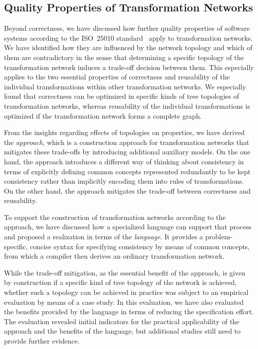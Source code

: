 \subsection{Quality Properties of Transformation Networks}

Beyond correctness, we have discussed how further quality properties of software systems according to the ISO~25010 standard~\cite{iso25010} apply to transformation networks.
We have identified how they are influenced by the network topology and which of them are contradictory in the sense that determining a specific topology of the transformation network induces a trade-off decision between them.
This especially applies to the two essential properties of correctness and reusability of the individual transformations within other transformation networks.
We especially found that correctness can be optimized in specific kinds of tree topologies of transformation networks, whereas reusability of the individual transformations is optimized if the transformation network forms a complete graph.

From the insights regarding effects of topologies on properties, we have derived the \emph{\commonalities approach}, which is a construction approach for transformation networks that mitigates these trade-offs by introducing additional auxiliary models.
On the one hand, the approach introduces a different way of thinking about consistency in terms of explicitly defining common concepts represented redundantly to be kept consistency rather than implicitly encoding them into rules of transformations.
On the other hand, the approach mitigates the trade-off between correctness and reusability.

To support the construction of transformation networks according to the \commonalities approach, we have discussed how a specialized language can support that process and proposed a realization in terms of the \emph{\commonalities language}.
It provides a problem-specific, concise syntax for specifying consistency by means of common concepts, from which a compiler then derives an ordinary transformation network.

While the trade-off mitigation, as the essential benefit of the approach, is given by construction if a specific kind of tree topology of the network is achieved, whether such a topology can be achieved in practice was subject to an empirical evaluation by means of a case study.
In this evaluation, we have also evaluated the benefits provided by the \commonalities language in terms of reducing the specification effort.
The evaluation revealed initial indicators for the practical applicability of the approach and the benefits of the language, but additional studies still need to provide further evidence.

